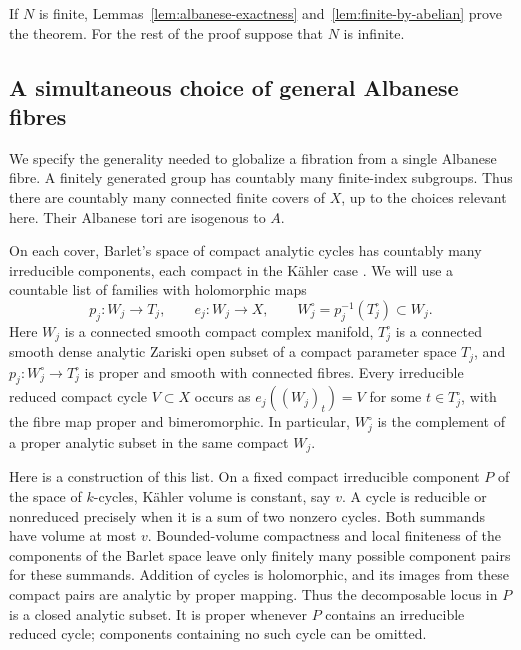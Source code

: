 If \(N\) is finite, Lemmas~\ref{lem:albanese-exactness}
and~\ref{lem:finite-by-abelian} prove the theorem. For the rest
of the proof suppose that \(N\) is infinite.

\subsection{A simultaneous choice of general Albanese fibres}

We specify the generality needed to globalize a fibration from a
single Albanese fibre. A finitely generated group has countably
many finite-index subgroups. Thus there are countably many connected
finite covers of \(X\), up to the choices relevant here. Their
Albanese tori are isogenous to \(A\).

On each cover, Barlet's space of compact analytic cycles
\cite{Barlet1975} has countably many irreducible components, each
compact in the K\"ahler case
\cite[Section~3, Convention~3.1]{CampanaGamma}.
We will use a countable list of families with holomorphic maps
\[
 p_j:W_j\longrightarrow T_j,\qquad e_j:W_j\longrightarrow X,\qquad
 W_j^\circ=p_j^{-1}(T_j^\circ)\subset W_j.
\]
Here \(W_j\) is a connected smooth compact complex manifold,
\(T_j^\circ\) is a connected smooth dense analytic Zariski open
subset of a compact parameter space \(T_j\), and
\(p_j:W_j^\circ\to T_j^\circ\) is proper and smooth with connected
fibres. Every irreducible reduced compact cycle \(V\subset X\)
occurs as \(e_j((W_j)_t)=V\) for some \(t\in T_j^\circ\), with the
fibre map proper and bimeromorphic. In particular,
\(W_j^\circ\) is the complement of a proper analytic subset in
the same compact \(W_j\).

Here is a construction of this list. On a fixed compact irreducible
component \(P\) of the space of \(k\)-cycles, K\"ahler volume is
constant, say \(v\). A cycle is reducible or nonreduced precisely
when it is a sum of two nonzero cycles. Both summands have volume at
most \(v\). Bounded-volume compactness and local finiteness of the
components of the Barlet space leave only finitely many possible
component pairs for these summands. Addition of cycles is holomorphic,
and its images from these compact pairs are analytic by proper mapping.
Thus the decomposable locus in \(P\) is a closed analytic subset.
It is proper whenever \(P\) contains an irreducible reduced cycle;
components containing no such cycle can be omitted.

